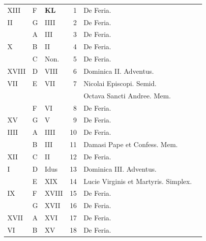 \newpage
\color{Red}\color{black}

\begin{center}
\begin{tabular}{l | l | l | r | l l}
\color{Red} XIII & F & \textbf{\color{Red} K\color{Blue}L} & 1 & De Feria. \\
\color{Red} II & G & \color{Red} IIII & 2 & De Feria. \\
\color{Red}  & \color{Red} A & \color{Red} III & 3 & De Feria. & \color{Red} \\
\color{Red} X & B & \color{Red} II & 4 & De Feria. & \color{Red} \\
\color{Red}  & C & \color{Red} Non. & 5 & De Feria. & \color{Red} \\
\color{Red} XVIII & D & \color{Red} VIII & 6 & \color{Red} Dominica II. Adventus. \\
\color{Red} VII & E & \color{Red} VII & 7 & \color{Red} Nicolai Episcopi. Semid. & \color{Red} \\
& & & & \quad \color{Red} Octava Sancti Andree. Mem. \\
\color{Red}  & F & \color{Red} VI & 8 & De Feria. & \color{Red} \\
\color{Red} XV & G & \color{Red} V & 9 & De Feria. & \color{Red} \\
\color{Red} IIII & \color{Red} A & \color{Red} IIII & 10 & De Feria. & \color{Red} \\
\color{Red}  & B & \color{Red} III & 11 & Damasi Pape et Confess. Mem. & \color{Red} \\
\color{Red} XII & C & \color{Red} II & 12 & De Feria. & \color{Red} \\
\color{Red} I & D & \color{Red} Idus & 13 & \color{Red} Dominica III. Adventus. \\
\color{Red}  & E & \color{Red} XIX & 14 & Lucie Virginis et Martyris. Simplex. & \color{Red} \\
\color{Red} IX & F & \color{Red} XVIII & 15 & De Feria. \\
\color{Red}  & G & \color{Red} XVII & 16 & De Feria. & \color{Red} \\
\color{Red} XVII & \color{Red} A & \color{Red} XVI & 17 & De Feria. \\%
\color{Red} VI & B & \color{Red} XV & 18 & De Feria. \\

\end{tabular}
\end{center}
